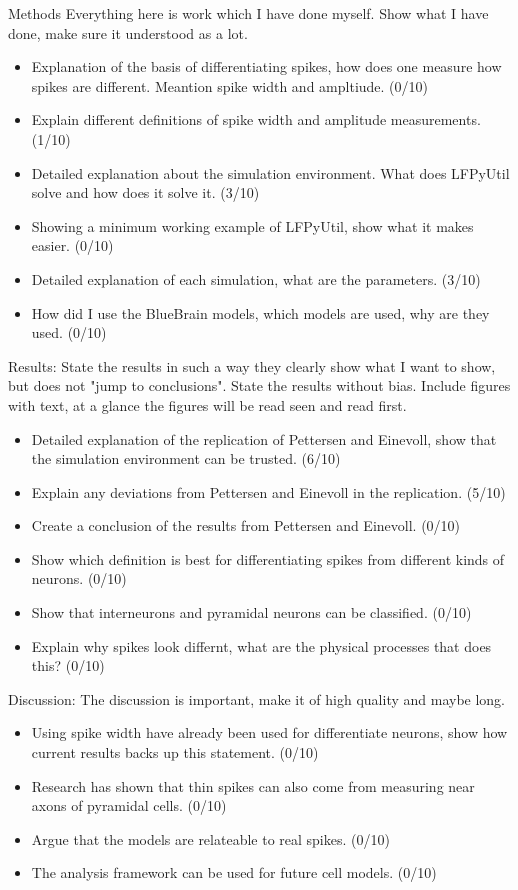 Methods
\newline
Everything here is work which I have done myself. Show what I have done, make sure
it understood as a lot.
\begin{itemize}
    \item Explanation of the basis of differentiating spikes, how does
        one measure how spikes are different. Meantion spike width and 
        ampltiude. (0/10)
    \item Explain different definitions of spike width and amplitude measurements. (1/10)
    \item Detailed explanation about the simulation environment. 
        What does LFPyUtil solve and how does it solve it. (3/10)
    \item Showing a minimum working example of LFPyUtil, show what it makes easier. (0/10)
    \item Detailed explanation of each simulation, what are the parameters. (3/10)
    \item How did I use the BlueBrain models, which models are used, why are they used. (0/10)
\end{itemize}

Results:
\newline
State the results in such a way they clearly show what I want to show, but
does not "jump to conclusions". State the results without bias.
Include figures with text, at a glance the figures will be read seen and read
first. 
\begin{itemize}
    \item Detailed explanation of the replication of Pettersen and Einevoll, show 
        that the simulation environment can be trusted. (6/10)
    \item Explain any deviations from Pettersen and Einevoll in the replication. (5/10)
    \item Create a conclusion of the results from Pettersen and Einevoll. (0/10)
    \item Show which definition is best for differentiating spikes from different
        kinds of neurons. (0/10)
    \item Show that interneurons and pyramidal neurons can be classified. (0/10)
    \item Explain why spikes look differnt, what are the physical processes that 
        does this? (0/10)
\end{itemize}

Discussion:
\newline
The discussion is important, make it of high quality and maybe long. 
\begin{itemize}
    \item Using spike width have already been used for differentiate neurons, 
        show how current results backs up this statement. (0/10)
    \item Research has shown that thin spikes can also come from measuring near
        axons of pyramidal cells. (0/10)
    \item Argue that the models are relateable to real spikes. (0/10)
    \item The analysis framework can be used for future cell models. (0/10)
\end{itemize}

